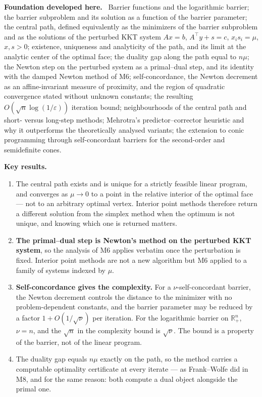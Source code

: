 \documentclass[11pt,a4paper]{article}
\newcommand{\mpart}[1]{\smallskip\noindent\textbf{#1}\ \ignorespaces}
\begin{document}
\mpart{Foundation developed here.} Barrier functions and the logarithmic barrier; the barrier
subproblem and its solution as a function of the barrier parameter; the central path, defined
equivalently as the minimizers of the barrier subproblem and as the solutions of the perturbed
KKT system $Ax=b$, $A^\top y+s=c$, $x_is_i=\mu$, $x,s>0$; existence, uniqueness and analyticity
of the path, and its limit at the analytic center of the optimal face; the duality gap along
the path equal to $n\mu$; the Newton step on the perturbed system as a primal--dual step, and
its identity with the damped Newton method of M6; self-concordance, the Newton decrement as an
affine-invariant measure of proximity, and the region of quadratic convergence stated without
unknown constants; the resulting $O(\sqrt n\log(1/\varepsilon))$ iteration bound;
neighbourhoods of the central path and short- versus long-step methods; Mehrotra's
predictor--corrector heuristic and why it outperforms the theoretically analysed variants; the
extension to conic programming through self-concordant barriers for the second-order and
semidefinite cones.

\mpart{Key results.}
\begin{enumerate}
\item The central path exists and is unique for a strictly feasible linear program, and
converges as $\mu\to0$ to a point in the relative interior of the optimal face --- not to an
arbitrary optimal vertex. Interior point methods therefore return a different solution from
the simplex method when the optimum is not unique, and knowing which one is returned matters.
\item \textbf{The primal--dual step is Newton's method on the perturbed KKT system}, so the
analysis of M6 applies verbatim once the perturbation is fixed. Interior point methods are not
a new algorithm but M6 applied to a family of systems indexed by $\mu$.
\item \textbf{Self-concordance gives the complexity.} For a $\nu$-self-concordant barrier, the
Newton decrement controls the distance to the minimizer with no problem-dependent constants,
and the barrier parameter may be reduced by a factor $1+O(1/\sqrt\nu)$ per iteration. For the
logarithmic barrier on $\mathbb{R}^n_+$, $\nu=n$, and the $\sqrt n$ in the complexity bound is
$\sqrt\nu$. The bound is a property of the barrier, not of the linear program.
\item The duality gap equals $n\mu$ exactly on the path, so the method carries a computable
optimality certificate at every iterate --- as Frank--Wolfe did in M8, and for the same reason:
both compute a dual object alongside the primal one.
\end{enumerate}
\end{document}
